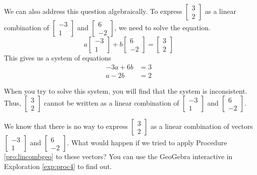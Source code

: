\documentclass{ximera}
\begin{document}
\begin{example}
\begin{explanation}
We can also address this question algebraically.  To express $\begin{bmatrix}3\\2\end{bmatrix}$ as a linear combination of $\begin{bmatrix}-3\\1\end{bmatrix}$ and $\begin{bmatrix}6\\-2\end{bmatrix}$, we need to solve the equation.
$$a\begin{bmatrix}-3\\1\end{bmatrix}+b\begin{bmatrix}6\\-2\end{bmatrix}=\begin{bmatrix}3\\2\end{bmatrix}$$
This gives us a system of equations
\begin{align*}
-3a+6b&=3\\
a-2b&=2
\end{align*}

When you try to solve this system, you will find that the system is inconsistent.  Thus, $\begin{bmatrix}3\\2\end{bmatrix}$ cannot be written as a linear combination of $\begin{bmatrix}-3\\1\end{bmatrix}$ and $\begin{bmatrix}6\\-2\end{bmatrix}$.

We know that there is no way to express $\begin{bmatrix}3\\2\end{bmatrix}$ as a linear combination of vectors $\begin{bmatrix}-3\\1\end{bmatrix}$ and $\begin{bmatrix}6\\-2\end{bmatrix}$.  What would happen if we tried to apply Procedure \ref{pro:lincombgeo} to these vectors?  You can use the GeoGebra interactive in Exploration \ref{exp:proc4} to find out.

\end{explanation}
\end{example}
\end{document}
